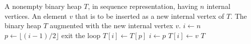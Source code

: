 
\begin{algorithmic}[1]
\Require A nonempty binary heap $T$, in sequence representation, having
  $n$ internal vertices. An element $v$ that is to be inserted as a
  new internal vertex of $T$.
\Ensure The binary heap $T$ augmented with the new internal vertex $v$.
\State $i \gets n$
  \State $p \gets \lfloor (i - 1) / 2 \rfloor$
    \State exit the loop
  \Else
    \State $T[i] \gets T[p]$
    \State $i \gets p$
  \EndIf
\EndWhile
\State $T[i] \gets v$
\State \Return $T$
\end{algorithmic}

